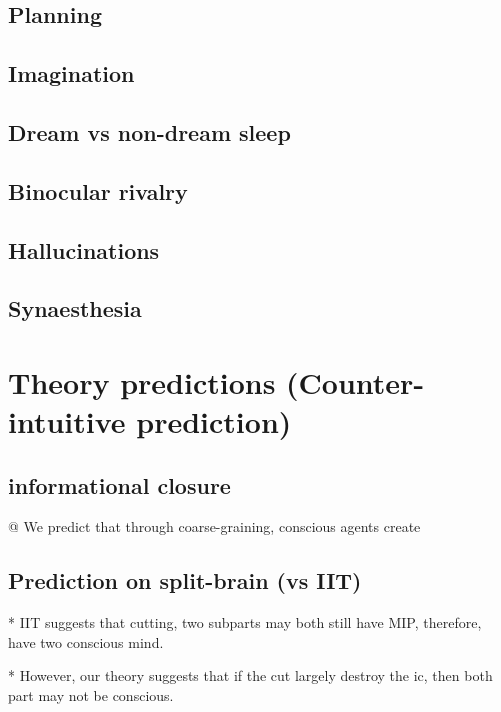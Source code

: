 \documentclass[utf8]{article}
\begin{document}
\begin{backup}
\subsection{Planning}
\subsection{Imagination}
\subsection{Dream vs non-dream sleep}
\subsection{Binocular rivalry}
\subsection{Hallucinations}
\subsection{Synaesthesia}




	\section*{Theory predictions (Counter-intuitive prediction)}

\subsection{informational closure}
\begin{ants}
	@ We predict that through coarse-graining, conscious agents create
\end{ants}



\subsection{Prediction on split-brain (vs IIT)}
* IIT suggests that cutting, two subparts may both still have MIP, therefore, have two conscious mind.

* However, our theory suggests that if the cut largely destroy the \ac{ic}, then both part may not be conscious.

\end{backup}
\end{document}
